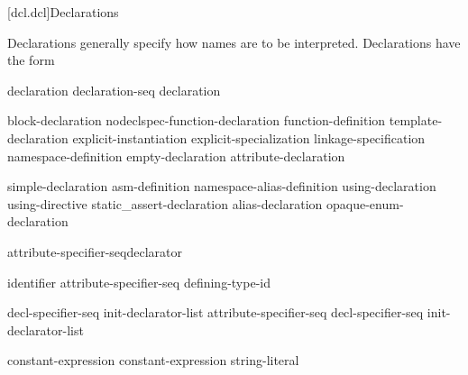 [dcl.dcl]{Declarations}%



\pnum
Declarations generally specify how names are to be interpreted. Declarations have
the form

\begin{bnf}
\br
    declaration\br
    declaration-seq declaration
\end{bnf}

\begin{bnf}
\br
    block-declaration\br
    nodeclspec-function-declaration\br
    function-definition\br
    template-declaration\br
    explicit-instantiation\br
    explicit-specialization\br
    linkage-specification\br
    namespace-definition\br
    empty-declaration\br
    attribute-declaration
\end{bnf}

\begin{bnf}
\br
    simple-declaration\br
    asm-definition\br
    namespace-alias-definition\br
    using-declaration\br
    using-directive\br
    static_assert-declaration\br
    alias-declaration\br
    opaque-enum-declaration
\end{bnf}

\begin{bnf}
\br
    attribute-specifier-seq\opt declarator \terminal{;}
\end{bnf}

\begin{bnf}
\br
     identifier attribute-specifier-seq\opt{} \terminal{=} defining-type-id \terminal{;}
\end{bnf}

\begin{bnf}
\br
    decl-specifier-seq init-declarator-list\opt{} \terminal{;}\br
    attribute-specifier-seq decl-specifier-seq init-declarator-list \terminal{;}
\end{bnf}

\begin{bnf}
\br
   \terminal{(} constant-expression \terminal{)} \terminal{;}\br
   \terminal{(} constant-expression \terminal{,} string-literal \terminal{)} \terminal{;}
\end{bnf}

